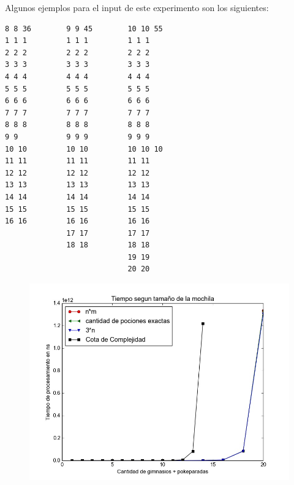       Algunos ejemplos para el input de este experimento son los siguientes:

 \begin{codesnippet}
            \begin{verbatim}
8 8 36        9 9 45        10 10 55
1 1 1         1 1 1         1 1 1
2 2 2         2 2 2         2 2 2
3 3 3         3 3 3         3 3 3
4 4 4         4 4 4         4 4 4
5 5 5         5 5 5         5 5 5
6 6 6         6 6 6         6 6 6
7 7 7         7 7 7         7 7 7
8 8 8         8 8 8         8 8 8
9 9           9 9 9         9 9 9
10 10         10 10         10 10 10
11 11         11 11         11 11
12 12         12 12         12 12
13 13         13 13         13 13
14 14         14 14         14 14
15 15         15 15         15 15
16 16         16 16         16 16
              17 17         17 17
              18 18         18 18
                            19 19
                            20 20

\end{verbatim}
            \end{codesnippet}

  
  \begin{figure}[H]
      \begin{center}
        \includegraphics[width=0.7\columnwidth]{imagenes/exp1_ej1.jpeg}
        \caption{}
      \end{center}
  \end{figure}

